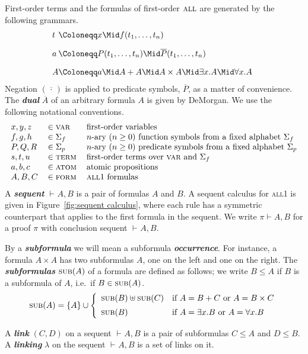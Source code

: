 \documentclass[UKenglish]{lipics-v2016}
\theoremstyle{plain}
\newcommand\defn[1]{\textit{\textbf{#1}}}
\newcommand\var{\textsc{var}}
\newcommand\terms{\textsc{term}}
\newcommand\atom{\textsc{atom}}
\newcommand\form{\textsc{form}}
\newcommand\all{\textsc{all}}
\newcommand\subs[1]{\textsc{sub}(#1)}
\newcommand\+{+}
\renewcommand\*{\times}
\newcommand\dual[1]{\overline{#1}}
\newcommand\sub{\leq}
\newcommand\seq[3][]{{\vdash_{#1}}#2,#3}
\newcommand\prf[3]{#1\vdash\!#2,#3}
\begin{document}
First-order terms and the formulas of first-order $\all$ are generated by the following grammars.
%
\setMidspace{5pt}
\[
\begin{array}{@{}l@{}l}
	t &\Coloneqq x \Mid f(t_1,\dots,t_n)
\\[10pt]
	a &\Coloneqq P(t_1,\dots,t_n) \Mid \dual P(t_1,\dots,t_n)
\\[10pt]
	A &\Coloneqq a \Mid A\+A \Mid A\*A \Mid \exists x.A \Mid \forall x.A
\end{array}
\]
%
Negation $(\dual{\,\cdot\,})$ is applied to predicate symbols, $\dual P$, as a matter of convenience. The \defn{dual} $\dual A$ of an arbitrary formula $A$ is given by DeMorgan. We use the following notational conventions.
%
\[
\begin{tabular}{@{}lll@{}} 
	$x,y,z$ & $\in \var$		& first-order variables\\
	$f,g,h$ & $\in \Sigma_f$	& $n$-ary $(n\geq 0)$ function symbols from a fixed alphabet $\Sigma_f$\\
	$P,Q,R$ & $\in \Sigma_p$	& $n$-ary $(n\geq 0)$ predicate symbols from a fixed alphabet $\Sigma_p$ \\
	$s,t,u$ & $\in \terms$ 		& first-order terms over $\var$ and $\Sigma_f$ \\
	$a,b,c$ & $\in \atom$		& atomic propositions \\
	$A,B,C$ & $\in \form$		& \all1 formulas \\
\end{tabular}
\]
%
A \defn{sequent} $\seq AB$ is a pair of formulas $A$ and $B$. A sequent calculus for \all1 is given in Figure~\ref{fig:sequent calculus}, where each rule has a symmetric counterpart that applies to the first formula in the sequent. We write $\prf\pi AB$ for a proof $\pi$ with conclusion sequent $\seq AB$.

By a \defn{subformula} we will mean a subformula \defn{occurrence}. For instance, a formula $A\*A$ has two subformulas $A$, one on the left and one on the right. The \defn{subformulas} $\subs A$ of a formula are defined as follows; we write $B\sub A$ if $B$ is a subformula of $A$, i.e.\ if $B\in\subs A$.
\[
	\subs A = \{A\} \cup
	\left\{\begin{array}{ll}
		\subs B\uplus\subs C	& \text{if $A=B\+C$ or $A=B\*C$} \\[5pt]
		\subs B					& \text{if $A=\exists x.B$ or $A=\forall x.B$}
	\end{array}\right.
\]

A \defn{link} $(C,D)$ on a sequent $\seq AB$ is a pair of subformulas $C\leq A$ and $D\leq B$. 
A \defn{linking} $\lambda$ on the sequent $\seq AB$ is a set of links on it.
\end{document}
